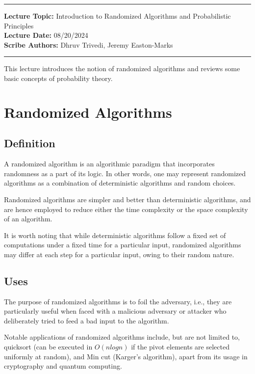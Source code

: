 \hrule
\vspace{0.1in}
\noindent
\textbf{Lecture Topic: }Introduction to Randomized Algorithms and Probabilistic Principles \\
\textbf{Lecture Date: }08/20/2024 \\
\textbf{Scribe Authors: }Dhruv Trivedi, Jeremy Easton-Marks
\vspace{0.1in}
\hrule
\vspace{0.1in}

This lecture introduces the notion of randomized algorithms and reviews some basic concepts of probability theory.

\section*{Randomized Algorithms}
    \subsection*{Definition}
        A randomized algorithm is an algorithmic paradigm that incorporates randomness as a part of its logic. In other words, one may represent randomized algorithms as a combination of deterministic algorithms and random choices.
            
        Randomized algorithms are simpler and better than deterministic algorithms, and are hence employed to reduce either the time complexity or the space complexity of an algorithm.

        It is worth noting that while deterministic algorithms follow a fixed set of computations under a fixed time for a particular input, randomized algorithms may differ at each step for a particular input, owing to their random nature.

    \subsection*{Uses}
        The purpose of randomized algorithms is to foil the adversary, i.e., they are particularly useful when faced with a malicious adversary or attacker who deliberately tried to feed a bad input to the algorithm.

        Notable applications of randomized algorithms include, but are not limited to, quicksort (can be executed in $O(nlogn)$ if the pivot elements are selected uniformly at random), and Min cut (Karger's algorithm), apart from its usage in cryptography and quantum computing.\\

